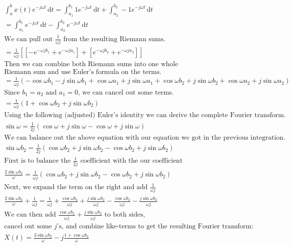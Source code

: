 \documentclass{article}
\begin{document}
\begin{gather*}
\int_a^b \! x(t)e^{-j\omega{t}} \, \mathrm{d}t = \int_{a_1}^{b_1} \! 1e^{-j\omega{t}} \, \mathrm{d}t + \int_{a_2}^{b_2} \! -1e^{-j\omega{t}} \, \mathrm{d}t \\
= \int_{a_1}^{b_1} \! e^{-j\omega{t}} \, \mathrm{d}t - \int_{a_2}^{b_2} \! e^{-j\omega{t}} \, \mathrm{d}t \\
\text{We can pull out $\frac{1}{\omega{j}}$ from the resulting Riemann sums.} \\
= \frac{1}{\omega{j}}[[-e^{-\omega{jb_{1}}}+e^{-\omega{ja_{1}}}]+[e^{-\omega{jb_{2}}}+e^{-\omega{ja_{2}}}]] \\
\text{Then we can combine both Riemann sums into one whole} \\
\text{Riemann sum and use Euler's formula on the terms.} \\
= \frac{1}{\omega{j}}(-\cos{\omega{b_1}}-j\sin{\omega{b_1}}+\cos{\omega{a_1}}+j\sin{\omega{a_1}}+\cos{\omega{b_2}}+j\sin{\omega{b_2}}+\cos{\omega{a_2}}+j\sin{\omega{a_2}}) \\
\text{Since $b_1=a_2$ and $a_1=0$, we can cancel out some terms.} \\
= \frac{1}{\omega{j}}(1+\cos{\omega{b_2}}+j\sin{\omega{b_2}}) \\
\text{Using the following (adjusted) Euler's identity we can derive the complete Fourier transform.} \\
\sin{\omega} = \frac{1}{2j}(\cos{\omega}+j\sin{\omega}-\cos{\omega}+j\sin{\omega}) \\
\text{We can balance out the above equation with our equation we got in the previous integration.} \\
\sin{\omega{b_2}} = \frac{1}{2j}(\cos{\omega{b_2}}+j\sin{\omega{b_2}}-\cos{\omega{b_2}}+j\sin{\omega{b_2}}) \\
\text{First is to balance the $\frac{1}{2j}$ coefficient with the our coefficient} \\
\frac{2\sin{\omega{b_2}}}{\omega} = \frac{1}{\omega{j}}(\cos{\omega{b_2}}+j\sin{\omega{b_2}}-\cos{\omega{b_2}}+j\sin{\omega{b_2}}) \\
\text{Next, we expand the term on the right and add $\frac{1}{\omega{j}}$} \\
\frac{2\sin{\omega{b_2}}}{\omega}+\frac{1}{\omega{j}} = \frac{1}{\omega{j}} + \frac{\cos{\omega{b_2}}}{\omega{j}}+\frac{j\sin{\omega{b_2}}}{\omega{j}}-\frac{\cos{\omega{b_2}}}{\omega{j}}-\frac{j\sin{\omega{b_2}}}{\omega{j}} \\
\text{We can then add $\frac{\cos{\omega{b_2}}}{\omega{j}}+\frac{j\sin{\omega{b_2}}}{\omega{j}}$ to both sides,} \\
\text{cancel out some $j$'s, and combine like-terms to get the resulting Fourier transform:} \\
X(t) = \frac{3\sin{\omega{b_2}}}{\omega}-j\frac{1+\cos{\omega{b_2}}}{\omega} \\
\end{gather*}
\end{document}
